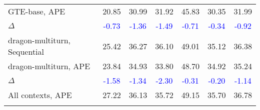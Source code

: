 \begin{table}[t]
{{\begin{tabular}{l|cccccc}
GTE-base, APE & 20.85 & 30.99 & 31.92 & 45.83 & 30.35 & 31.99 \\
$\Delta$ & \textcolor{blue}{-0.73} & \textcolor{blue}{-1.36} & \textcolor{blue}{-1.49} & \textcolor{blue}{-0.71} & \textcolor{blue}{-0.34} & \textcolor{blue}{-0.92} \\
\midrule
dragon-multiturn, Sequential & 25.42 & 36.27 & 36.10 & 49.01 & 35.12 & 36.38 \\
dragon-multiturn, APE & 23.84 & 34.93 & 33.80 & 48.70 & 34.92 & 35.24 \\
$\Delta$ & \textcolor{blue}{-1.58} & \textcolor{blue}{-1.34} & \textcolor{blue}{-2.30} & \textcolor{blue}{-0.31} & \textcolor{blue}{-0.20} & \textcolor{blue}{-1.14} \\
\midrule
All contexts, APE & 27.22 & 36.13 & 35.72 & 49.15 & 35.70 & 36.78 \\
\fi
\bottomrule
\end{tabular}}}
\label{tab:chatragbench}
\end{table}